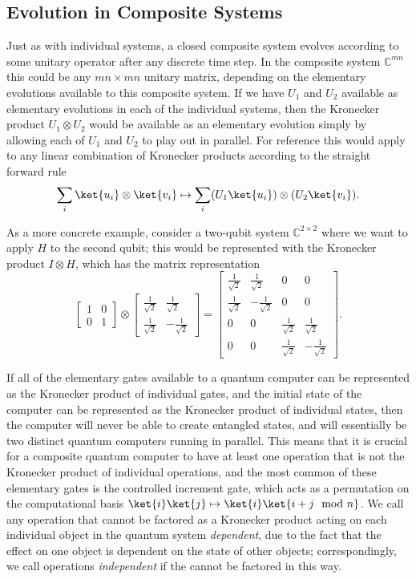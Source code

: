 \subsection{Evolution in Composite Systems}\label{composite-evolution}
Just as with individual systems, a closed composite system evolves according to some unitary operator after any discrete time step. In the composite system $\mathbb{C}^{mn}$ this could be any $mn \times mn$ unitary matrix, depending on the elementary evolutions available to this composite system. If we have $U_1$ and $U_2$ available as elementary evolutions in each of the individual systems, then the Kronecker product $U_1 \otimes U_2$ would be available as an elementary evolution simply by allowing each of $U_1$ and $U_2$ to play out in parallel. For reference this would apply to any linear combination of Kronecker products according to the straight forward rule
\[\sum_i \ket{u_i}\otimes\ket{v_i} \mapsto \sum_i (U_1\ket{u_i})\otimes (U_2\ket{v_i}).\]

As a more concrete example, consider a two-qubit system $\mathbb{C}^{2\times 2}$ where we want to apply $H$ to the second qubit; this would be represented with the Kronecker product $I \otimes H$, which has the matrix representation
\[
\left[\begin{matrix}
	1&0\\
	0&1
\end{matrix}\right]
\otimes
\left[\begin{matrix}
	\frac{1}{\sqrt{2}}&\frac{1}{\sqrt{2}}\\
	\frac{1}{\sqrt{2}}&-\frac{1}{\sqrt{2}}
\end{matrix}\right]
=
\left[\begin{matrix}
	\frac{1}{\sqrt{2}}&\frac{1}{\sqrt{2}}&0&0\\
	\frac{1}{\sqrt{2}}&-\frac{1}{\sqrt{2}}&0&0\\
	0&0&\frac{1}{\sqrt{2}}&\frac{1}{\sqrt{2}}\\
	0&0&\frac{1}{\sqrt{2}}&-\frac{1}{\sqrt{2}}
\end{matrix}\right].
\]

If all of the elementary gates available to a quantum computer can be represented as the Kronecker product of individual gates, and the initial state of the computer can be represented as the Kronecker product of individual states, then the computer will never be able to create entangled states, and will essentially be two distinct quantum computers running in parallel. This means that it is crucial for a composite quantum computer to have at least one operation that is not the Kronecker product of individual operations, and the most common of these elementary gates is the controlled increment gate, which acts as a permutation on the computational basis $\ket{i}\ket{j} \mapsto \ket{i}\ket{i+j \mod n}$. We call any operation that cannot be factored as a Kronecker product acting on each individual object in the quantum system \emph{dependent}, due to the fact that the effect on one object is dependent on the state of other objects; correspondingly, we call operations \emph{independent} if the cannot be factored in this way.

